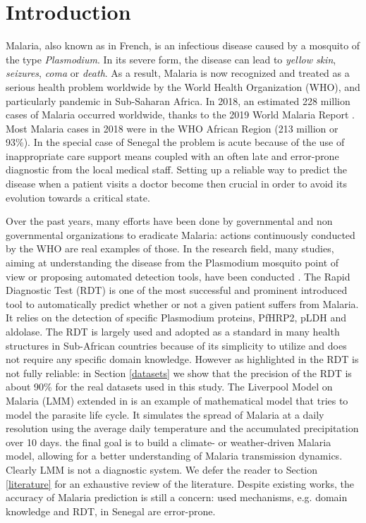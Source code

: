 \section{Introduction}\label{Introduction}
Malaria, also known as \emph{} in French, is an infectious disease caused by a mosquito of the type \emph{Plasmodium}. 
In its severe form, the disease can lead to \emph{yellow skin}, \emph{seizures}, \emph{coma} or \emph{death}. 
As a result, Malaria is now recognized  and treated as a serious health problem worldwide by the World Health Organization (WHO), and particularly pandemic in Sub-Saharan Africa. 
In 2018, an estimated 228 million cases of Malaria occurred worldwide, thanks to the  2019 World Malaria Report \cite{19WMR}. Most Malaria cases in 2018 were in the WHO African Region (213 million or 93\%). In the special case of Senegal the problem is acute because of the use of inappropriate care support means coupled with an often late and error-prone diagnostic from the local medical staff. Setting up a reliable way to predict the disease when a patient visits a doctor become then crucial in order to avoid its evolution towards a critical state.

Over the past years, many efforts have been done by governmental and non governmental organizations  to eradicate Malaria:  actions continuously conducted by the WHO are real examples of those.  In the research field, many studies, aiming at understanding the disease from the Plasmodium mosquito point of view or proposing automated detection tools, have been conducted \cite{Ga19,Le74,ermert2011development,Hu17}. The Rapid Diagnostic Test (RDT) \cite{Hu17} is one of the most successful and prominent introduced tool to automatically predict whether or not a given patient suffers from Malaria. It relies on the
detection of specific Plasmodium proteins, PfHRP2, pLDH
and aldolase. The RDT is largely used and adopted as a standard in many health structures in Sub-African countries because of its simplicity to utilize and does not require any specific domain knowledge. However as highlighted in \cite{Hu17} the RDT is not fully reliable:  in Section \ref{datasets} we show that the precision of the RDT is about 90\% for the real datasets used in this study.
The Liverpool Model on Malaria (LMM) extended in \cite{ermert2011development} is an example of mathematical model that tries to model the parasite life cycle. It simulates the spread of Malaria at a daily resolution using the average daily temperature and the accumulated precipitation over 10 days. the final goal is to build a climate- or weather-driven Malaria model,  allowing for a better understanding of Malaria transmission dynamics. Clearly LMM is not a diagnostic system. We defer the reader to Section \ref{literature} for an exhaustive review of the literature. Despite existing works,  the accuracy of Malaria prediction is still a concern: used mechanisms, e.g. domain knowledge and RDT, in Senegal are error-prone.

